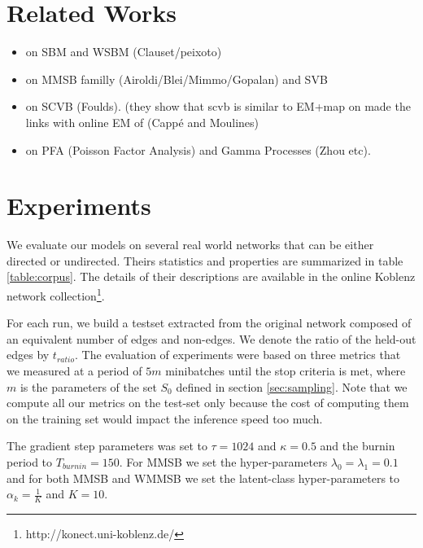 \section{Related Works}

\begin{itemize}
\item on SBM and WSBM (Clauset/peixoto)
\item on MMSB familly (Airoldi/Blei/Mimmo/Gopalan) and SVB
\item on SCVB (Foulds). (they show that scvb is similar to EM+map on made the links with online EM of (Cappé and Moulines)
\item on PFA (Poisson Factor Analysis) and Gamma Processes (Zhou etc).
\end{itemize}







\section{Experiments}

%
%


We evaluate our models on several real world networks that can be either directed or undirected. Theirs statistics and properties are summarized in table \ref{table:corpus}. The details of their descriptions are available in the online Koblenz network collection\footnote{http://konect.uni-koblenz.de/}.

\begin{table}[h]
\bgroup
\def\arraystretch{1} %
	
\egroup
\label{table:corpus}
\end{table}


%
%

For each run, we build a testset extracted from the original network composed of an equivalent number of edges and non-edges. We denote the ratio of the held-out edges by $t_{ratio}$. The evaluation of experiments were based on three metrics that we measured at a period of $5m$ minibatches until the stop criteria is met, where $m$ is the parameters of the set $S_0$ defined in section \ref{sec:sampling}.
Note that we compute all our metrics on the test-set only because the cost of computing them on the training set would impact the inference speed too much.

The gradient step parameters was set to $\tau=1024$ and $\kappa=0.5$ and the burnin period  to $T_{burnin}=150$. For MMSB we set the hyper-parameters $\lambda_0=\lambda_1=0.1$ and for both MMSB and WMMSB we set the latent-class hyper-parameters to $\alpha_k=\frac{1}{K}$ and $K=10$.


